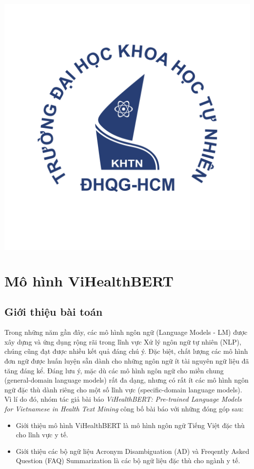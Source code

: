 \documentclass[12pt]{article}
\begin{document}
\begin{titlepage}
\includegraphics[scale=.3]{img/hcmus-logo.png}\\[1cm] 

\vfill
\end{titlepage}
	
	
\tableofcontents
\pagebreak

\section{Mô hình ViHealthBERT}
\subsection{Giới thiệu bài toán}
Trong những năm gần đây, các mô hình ngôn ngữ (Language Models - LM) được xây dựng và ứng dụng rộng rãi trong lĩnh vực Xử lý ngôn ngữ tự nhiên (NLP), chúng cũng đạt được nhiều kết quả đáng chú ý. Đặc biệt, chất lượng các mô hình đơn ngữ được huấn luyện sẵn dành cho những ngôn ngữ ít tài nguyên ngữ liệu đã tăng đáng kể. Đáng lưu ý, mặc dù các mô hình ngôn ngữ cho miền chung (general-domain language models) rất đa dạng, nhưng có rất ít các mô hình ngôn ngữ đặc thù dành riêng cho một số lĩnh vực (specific-domain language models). Vì lí do đó, nhóm tác giả bài báo \textit{ViHealthBERT: Pre-trained Language Models for Vietnamese in Health Text Mining}\cite{minh-EtAl:2022:LREC} công bố bài báo với những đóng góp sau:
\begin{itemize}
    \item Giới thiệu mô hình ViHealthBERT là mô hình ngôn ngữ Tiếng Việt đặc thù cho lĩnh vực y tế.
    \item Giới thiệu các bộ ngữ liệu Acronym Disambiguation (AD) và Freqently Asked Question (FAQ) Summarization là các bộ ngữ liệu đặc thù cho ngành y tế.
\end{itemize}
\end{document}
